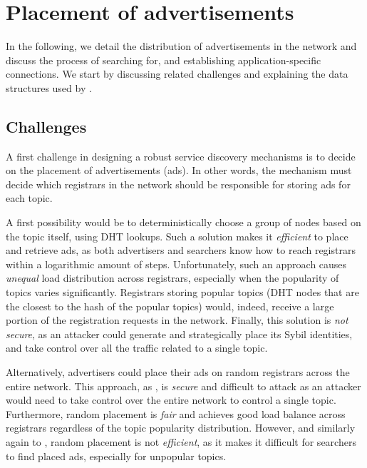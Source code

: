 
\section{Placement of advertisements}
\label{sec:placement}

In the following, we detail the distribution of advertisements in the network and discuss the process of searching for, and establishing application-specific connections.
We start by discussing related challenges and explaining the data structures used by \sysname. 

\subsection{Challenges}


A first challenge in designing a robust service discovery mechanisms is to decide on the placement of advertisements (ads).
In other words, the mechanism must decide which registrars in the network should be responsible for storing ads for each topic.

A first possibility would be to deterministically choose a group of nodes based on the topic itself, using DHT lookups.
Such a solution makes it \emph{efficient} to place and retrieve ads, as both advertisers and searchers know how to reach registrars within a logarithmic amount of steps.
Unfortunately, such an approach causes \emph{unequal} load distribution across registrars, especially when the popularity of topics varies significantly.
Registrars storing popular topics (\ie DHT nodes that are the closest to the hash of the popular topics) would, indeed, receive a large portion of the registration requests in the network. 
Finally, this solution is \emph{not secure}, as an attacker could generate and strategically place its Sybil identities, and take control over all the traffic related to a single topic. 

Alternatively, advertisers could place their ads on random registrars across the entire network. 
This approach, as \discv, is \emph{secure} and difficult to attack as an attacker would need to take control over the entire network to control a single topic.
Furthermore, random placement is \emph{fair} and achieves good load balance across registrars regardless of the topic popularity distribution.
However, and similarly again to \discv, random placement is not \emph{efficient}, as it makes it difficult for searchers to find placed ads, especially for unpopular topics. 

